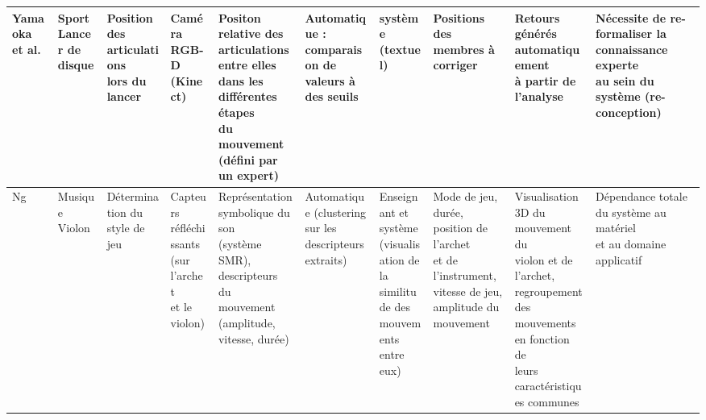 \begin{landscape}
\begin{table}[]
{\begin{tabular}{|l|l|l|l|l|l|l|l|l|l|}
Yamaoka et al. & \makecell[l]{Sport\\Lancer de disque} & \makecell[l]{Position des articulations\\lors du lancer} & \makecell[l]{Caméra RGB-D\\(Kinect)} & \makecell[l]{Positon relative des articulations\\entre elles dans les différentes étapes\\du mouvement (défini par un expert)} & \makecell[l]{Automatique : comparaison de\\valeurs à des seuils} & système (textuel) & Positions des membres à corriger & \makecell[l]{Retours générés automatiquement\\à partir de l'analyse} & \makecell[l]{Nécessite de re-formaliser la connaissance experte\\au sein du système (re-conception)} \\ \hline

Ng & \makecell[l]{Musique\\Violon} & \makecell[l]{Détermination du\\style de jeu} & \makecell[l]{Capteurs\\réfléchissants\\(sur l'archet\\et le violon)} & \makecell[l]{Représentation symbolique du son\\(système SMR), descripteurs du\\mouvement (amplitude, vitesse, durée)} & \makecell[l]{Automatique (clustering sur les\\descripteurs extraits)} & \makecell[l]{Enseignant et système\\(visualisation de la\\similitude des\\mouvements entre\\eux)} & \makecell[l]{Mode de jeu, durée, position de l'archet\\ et de l'instrument, vitesse de jeu,\\amplitude du mouvement} & \makecell[l]{Visualisation 3D du mouvement du\\violon et de l'archet, regroupement\\ des mouvements en fonction de\\leurs caractéristiques communes} & \makecell[l]{Dépendance totale du système au matériel\\et au domaine applicatif} \\ \hline


\end{tabular}}
\end{table}
\end{landscape}
